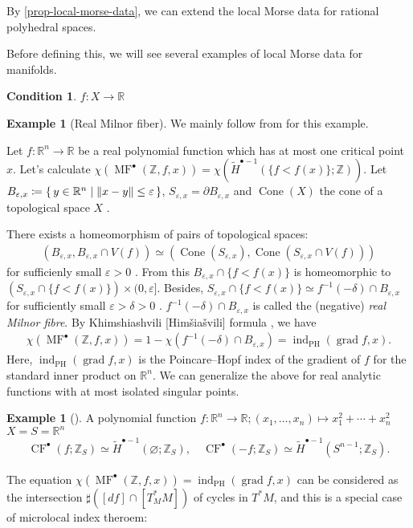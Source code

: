 \documentclass[a4paper,dvipdfmx,reqno,12pt]{amsart}
\theoremstyle{definition}
\newtheorem{Eg}[Thm]{Example}
\newtheorem{Cond}[Thm]{Condition}
\newcommand{\deq}{\coloneqq}
\newcommand{\emp}{\varnothing}%
\newcommand{\R}{\mathbb{R}}%
\newcommand{\Z}{\mathbb{Z}}%
\newcommand{\vep}{\varepsilon}%
\newcommand{\opn}[1]{\operatorname{#1}}
\numberwithin{equation}{section}
\begin{document}
By \cref{prop-local-morse-data}, we can extend 
the local Morse data for rational polyhedral spaces.

Before defining this, 
we will see several examples of local Morse data 
for manifolds.

\begin{Cond}
\label{condition-isolated-singularity}
$f\colon X\to \mathbb{R}$
\end{Cond}

\begin{Eg}[{Real Milnor fiber}] \label{eg:}
We mainly follow from \cite[3.2]{MR3779558} for this example.

Let $f\colon \R^{n}\to \R$ be a real polynomial function
which has at most one critical point $x$.
Let's calculate 
$\chi (\opn{MF}^{\bullet}(\Z,f,x))
=\chi(\tilde{H}^{\bullet-1}(\{f<f(x)\};\Z))$.
Let $B_{\vep,x}\deq \set{y\in \R^{n}\mid \|x-y\|\leq \vep}$,
$S_{\vep,x}=\partial B_{\vep,x}$ and 
$\opn{Cone}(X)$ the cone of a topological space $X$
\cite[Example 4.4]{hatcherAlgebraicTopology2002a}.

There exists a homeomorphism of pairs of
topological spaces:
\begin{align}
(B_{\vep,x},B_{\vep,x}\cap V(f))\simeq 
(\opn{Cone}(S_{\vep,x}),\opn{Cone}(S_{\vep,x}\cap V(f)))
\end{align}
for sufficienly small $\vep>0$
\cite[Theorem 2.10]{MR0239612}.
From this $B_{\vep,x}\cap\{f<f(x)\}$ is homeomorphic to
$(S_{\vep,x}\cap \{f<f(x)\})\times (0,\vep]$.
Besides, $S_{\vep,x}\cap \{f<f(x)\}\simeq 
f^{-1}(-\delta)\cap B_{\vep,x}$
for sufficiently small $\vep>\delta>0$ 
\cite[Lemma 5.10]{MR0239612}.
$f^{-1}(-\delta)\cap B_{\vep,x}$ is called 
the (negative) \emph{real Milnor fibre}.
By Khimshiashvili [Himšiašvili] formula \cite{MR0458467}, we have
\begin{align} \label{eq: Khim}
  \chi(\opn{MF}^{\bullet}(\Z,f,x))
=1-\chi(f^{-1}(-\delta)\cap B_{\vep,x})
=\opn{ind}_{\opn{PH}}(\opn{grad} f,x).
\end{align}
Here, $\opn{ind}_{\opn{PH}}(\opn{grad} f,x)$ is the 
Poincare--Hopf index of the gradient of $f$ for the standard 
inner product on $\R^{n}$.
We can generalize the above for real analytic functions with 
at most isolated singular points.
\end{Eg}

\begin{Eg}[{\cite[p.22]{MR2031639}}]
  A polynomial function $f\colon \R^{n}\to \R;(x_1,\ldots,x_n)\mapsto x_1^{2}+\cdots+x_n^{2}$
  $X=S=\R^{n}$
  \begin{align}
    \opn{CF}^{\bullet}(f;\Z_S)\simeq \tilde{H}^{\bullet-1}(\emp;\Z_S),
    \quad \opn{CF}^{\bullet}(-f;\Z_S) \simeq \tilde{H}^{\bullet-1}(S^{n-1};\Z_S).
  \end{align}
\end{Eg}
The equation $\chi(\opn{MF}^{\bullet}(\Z,f,x))=
\opn{ind}_{\opn{PH}}(\opn{grad} f,x)$ can be considered 
as the intersection $\sharp ([df]\cap [T^{*}_M M])$ of cycles in $T^{*}M$,
and this is a special case of
microlocal index theroem:
\end{document}
